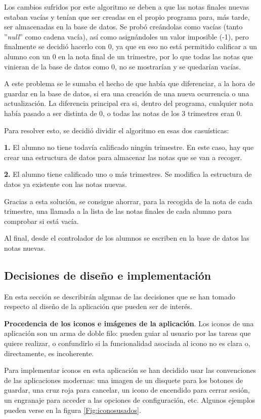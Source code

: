 Los cambios sufridos por este algoritmo se deben a que las notas finales nuevas estaban vacías y tenían que ser creadas en el propio programa para, más tarde, ser almacenadas en la base de datos. Se probó creándolas como vacías (tanto ''\textit{null}'' como cadena vacía), así como asignándoles un valor imposible (-1), pero finalmente se decidió hacerlo con 0, ya que en \gls{eso} no está permitido calificar a un alumno con un 0 en la nota final de un trimestre, por lo que todas las notas que vinieran de la base de datos como 0, no se mostrarían y se quedarían vacías.

A este problema se le sumaba el hecho de que había que diferenciar, a la hora de guardar en la base de datos, si era una creación de una nueva ocurrencia o una actualización. La diferencia principal era si, dentro del programa, cualquier nota había pasado a ser distinta de 0, o todas las notas de los 3 trimestres eran 0.

Para resolver esto, se decidió dividir el algoritmo en esas dos casuísticas: 

\textbf{1.} El alumno no tiene todavía calificado ningún trimestre.
En este caso, hay que crear una estructura de datos para almacenar las notas que se van a recoger.

\textbf{2.} El alumno tiene calificado uno o más trimestres.
Se modifica la estructura de datos ya existente con las notas nuevas.

Gracias a esta solución, se consigue ahorrar, para la recogida de la nota de cada trimestre, una llamada a la lista de las notas finales de cada alumno para comprobar si está vacía.

Al final, desde el controlador de los alumnos se escriben en la base de datos las notas nuevas.


\subsection{Decisiones de diseño e implementación}
En esta sección se describirán algunas de las decisiones que se han tomado respecto al diseño de la aplicación que pueden ser de interés.

\textbf{Procedencia de los iconos e imágenes de la aplicación}.
Los iconos de una aplicación son un arma de doble filo: pueden guiar al usuario por las tareas que quiere realizar, o confundirlo si la funcionalidad asociada al icono no es clara o, directamente, es incoherente.

Para implementar iconos en esta aplicación se han decidido usar las convenciones de las aplicaciones modernas: una imagen de un disquete para los botones de guardar, una cruz roja para cancelar, un icono de encendido para cerrar sesión, un engranaje para acceder a las opciones de configuración, etc. Algunos ejemplos pueden verse en la figura \ref{Fig:iconosusados}.

